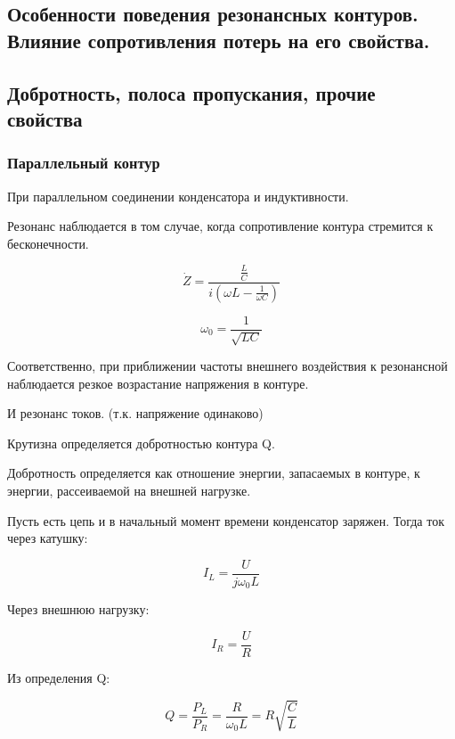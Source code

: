 \subsection{Особенности поведения резонансных контуров. Влияние сопротивления потерь на его свойства. }
\subsection{Добротность, полоса пропускания, прочие свойства}

\subsubsection{Параллельный контур}

При параллельном соединении конденсатора и индуктивности.

Резонанс наблюдается в том случае, когда сопротивление контура стремится к бесконечности.

\begin{equation}
\dot Z = \frac{\frac{L}{C}}{i(\omega L - \frac{1}{\omega C})}
\end{equation}

\begin{equation}
\omega_0 = \frac{1}{\sqrt{L C}}
\end{equation}

Соответственно, при приближении частоты внешнего воздействия к резонансной наблюдается резкое возрастание напряжения в контуре.

И резонанс токов. (т.к. напряжение одинаково)


Крутизна определяется добротностью контура Q.

Добротность определяется как отношение энергии, запасаемых в контуре, к энергии, рассеиваемой на внешней нагрузке.

Пусть есть цепь и в начальный момент времени конденсатор заряжен. Тогда ток через катушку:

\begin{equation}
I_L = \frac{U}{j \omega_0 L}
\end{equation}

Через внешнюю нагрузку:

\begin{equation}
I_R = \frac{U}{R}
\end{equation}

Из определения Q:

\begin{equation}
Q = \frac{P_L}{P_R} = \frac{R}{\omega_0 L} = R \sqrt{\frac{C}{L}}
\end{equation}

